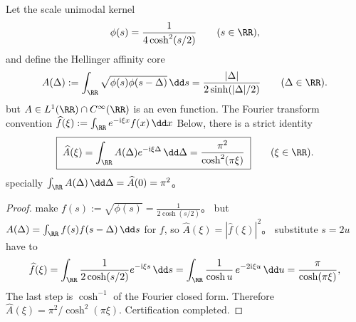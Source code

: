 %

\begin{proposition}\label{prop:xi-hellinger-kernel-fourier-sech2}
Let the scale unimodal kernel
\[
\phi(s)=\frac{1}{4\cosh^{2}(s/2)}\qquad(s\in\RR),
\]
and define the Hellinger affinity core
\[
A(\Delta):=\int_{\RR}\sqrt{\phi(s)\phi(s-\Delta)}\,\dd s
=\frac{|\Delta|}{2\sinh(|\Delta|/2)}\qquad(\Delta\in\RR).
\]
but \(A\in L^{1}(\RR)\cap C^\infty(\RR)\) is an even function.
The Fourier transform convention
\(
\widehat f(\xi):=\int_{\RR}e^{-\mathrm{i}\xi x}f(x)\,\dd x
\)
Below, there is a strict identity
\[
\boxed{\;
\widehat A(\xi)=\int_{\RR}A(\Delta)e^{-\mathrm{i}\xi\Delta}\,\dd\Delta
=\frac{\pi^{2}}{\cosh^{2}(\pi\xi)}\;}
\qquad(\xi\in\RR).
\]
specially
\(
\int_{\RR}A(\Delta)\,\dd\Delta=\widehat A(0)=\pi^{2}
\)。
\end{proposition}
\begin{proof}
make
\(
f(s):=\sqrt{\phi(s)}=\frac{1}{2\cosh(s/2)}
\)。
but
\(
A(\Delta)=\int_{\RR}f(s)f(s-\Delta)\,\dd s
\)
for \(f\), so \(\widehat A(\xi)=|\widehat f(\xi)|^{2}\)。
substitute \(s=2u\) have to
\[
\widehat f(\xi)
=\int_{\RR}\frac{1}{2\cosh(s/2)}e^{-\mathrm{i}\xi s}\,\dd s
=\int_{\RR}\frac{1}{\cosh u}\,e^{-2\mathrm{i}\xi u}\,\dd u
=\frac{\pi}{\cosh(\pi\xi)},
\]
The last step is \(\cosh^{-1}\) of the Fourier closed form.
Therefore \(\widehat A(\xi)=\pi^{2}/\cosh^{2}(\pi\xi)\). Certification completed.
\end{proof}



